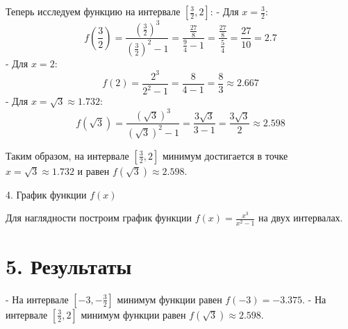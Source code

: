 \documentclass[a4paper,12pt]{article}
\begin{document}
Теперь исследуем функцию на интервале \( \left[ \frac{3}{2}, 2 \right] \):
- Для \( x = \frac{3}{2} \):
\[
f\left( \frac{3}{2} \right) = \frac{\left( \frac{3}{2} \right)^3}{\left( \frac{3}{2} \right)^2 - 1} = \frac{\frac{27}{8}}{\frac{9}{4} - 1} = \frac{\frac{27}{8}}{\frac{5}{4}} = \frac{27}{10} = 2.7
\]
- Для \( x = 2 \):
\[
f(2) = \frac{2^3}{2^2 - 1} = \frac{8}{4 - 1} = \frac{8}{3} \approx 2.667
\]
- Для \( x = \sqrt{3} \approx 1.732 \):
\[
f(\sqrt{3}) = \frac{(\sqrt{3})^3}{(\sqrt{3})^2 - 1} = \frac{3\sqrt{3}}{3 - 1} = \frac{3\sqrt{3}}{2} \approx 2.598
\]

Таким образом, на интервале \( \left[ \frac{3}{2}, 2 \right] \) минимум достигается в точке \( x = \sqrt{3} \approx 1.732 \) и равен \( f(\sqrt{3}) \approx 2.598 \).

4. График функции \( f(x) \)

Для наглядности построим график функции \( f(x) = \frac{x^3}{x^2 - 1} \) на двух интервалах.

\begin{center}
\end{center}

\section*{5. Результаты}

- На интервале \( \left[ -3, -\frac{3}{2} \right] \) минимум функции равен \( f(-3) = -3.375 \).
- На интервале \( \left[ \frac{3}{2}, 2 \right] \) минимум функции равен \( f(\sqrt{3}) \approx 2.598 \).
\end{document}
